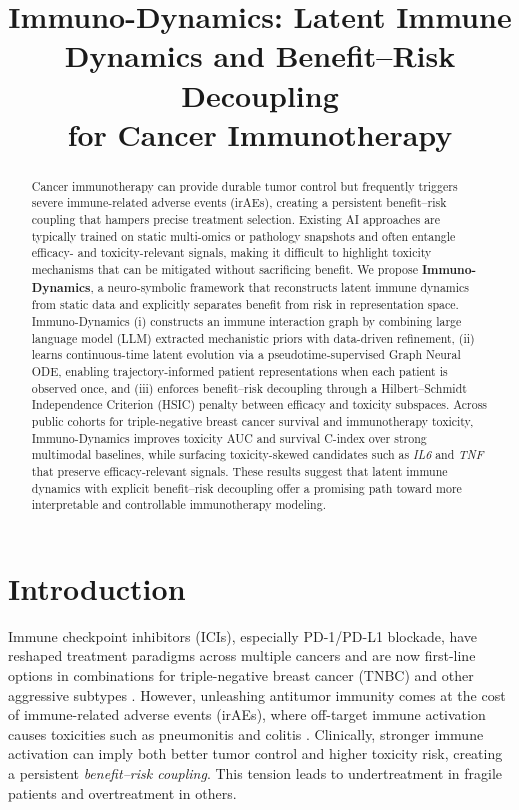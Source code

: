 \documentclass{article}
\title{Immuno-Dynamics: Latent Immune Dynamics and Benefit--Risk Decoupling\\
for Cancer Immunotherapy}
\begin{document}
\maketitle

\begin{abstract}
Cancer immunotherapy can provide durable tumor control but frequently triggers severe immune-related adverse events (irAEs), creating a persistent benefit--risk coupling that hampers precise treatment selection. Existing AI approaches are typically trained on static multi-omics or pathology snapshots and often entangle efficacy- and toxicity-relevant signals, making it difficult to highlight toxicity mechanisms that can be mitigated without sacrificing benefit. We propose \textbf{Immuno-Dynamics}, a neuro-symbolic framework that reconstructs latent immune dynamics from static data and explicitly separates benefit from risk in representation space. Immuno-Dynamics (i) constructs an immune interaction graph by combining large language model (LLM) extracted mechanistic priors with data-driven refinement, (ii) learns continuous-time latent evolution via a pseudotime-supervised Graph Neural ODE, enabling trajectory-informed patient representations when each patient is observed once, and (iii) enforces benefit--risk decoupling through a Hilbert--Schmidt Independence Criterion (HSIC) penalty between efficacy and toxicity subspaces. Across public cohorts for triple-negative breast cancer survival and immunotherapy toxicity, Immuno-Dynamics improves toxicity AUC and survival C-index over strong multimodal baselines, while surfacing toxicity-skewed candidates such as \textit{IL6} and \textit{TNF} that preserve efficacy-relevant signals. These results suggest that latent immune dynamics with explicit benefit--risk decoupling offer a promising path toward more interpretable and controllable immunotherapy modeling.
\end{abstract}


\section{Introduction}

Immune checkpoint inhibitors (ICIs), especially PD-1/PD-L1 blockade, have reshaped treatment paradigms across multiple cancers and are now first-line options in combinations for triple-negative breast cancer (TNBC) and other aggressive subtypes \cite{schmid2018atezolizumab,cortes2022pembrolizumab,zhang2025distinct}. However, unleashing antitumor immunity comes at the cost of immune-related adverse events (irAEs), where off-target immune activation causes toxicities such as pneumonitis and colitis \cite{martins2019adverse,haanen2022management}. Clinically, stronger immune activation can imply both better tumor control and higher toxicity risk, creating a persistent \emph{benefit--risk coupling}. This tension leads to undertreatment in fragile patients and overtreatment in others.
\end{document}
